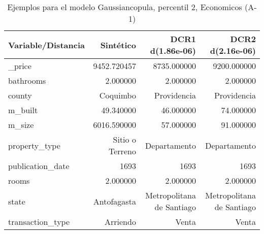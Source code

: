 \begin{table}[H]
\centering
\fontsize{10}{14}\selectfont
\caption{Ejemplos para el modelo Gaussiancopula, percentil 2, Economicos (A-1)}
\label{table-example-economicos-a-1-gaussiancopula-2p}
\begin{tabular}{|l|r|r|r|}
\hline
\rowcolor[gray]{0.8}
Variable/Distancia & Sintético & DCR1 d(1.86e-06) & DCR2 d(2.16e-06) \\
\hline \_price & \cellcolor[rgb]{0.9, 0.54, 0.52} 9452.720457 & 8735.000000 & 9200.000000 \\
\hline bathrooms & \cellcolor[rgb]{0.9, 0.54, 0.52} 2.000000 & \cellcolor[rgb]{0.9, 0.54, 0.52} 2.000000 & \cellcolor[rgb]{0.9, 0.54, 0.52} 2.000000 \\
\hline county & \cellcolor[rgb]{0.9, 0.54, 0.52} Coquimbo & Providencia & Providencia \\
\hline m\_built & \cellcolor[rgb]{0.9, 0.54, 0.52} 49.340000 & 46.000000 & 74.000000 \\
\hline m\_size & \cellcolor[rgb]{0.9, 0.54, 0.52} 6016.590000 & 57.000000 & 91.000000 \\
\hline property\_type & \cellcolor[rgb]{0.9, 0.54, 0.52} Sitio o Terreno & Departamento & Departamento \\
\hline publication\_date & \cellcolor[rgb]{0.9, 0.54, 0.52} 1693 & \cellcolor[rgb]{0.9, 0.54, 0.52} 1693 & \cellcolor[rgb]{0.9, 0.54, 0.52} 1693 \\
\hline rooms & \cellcolor[rgb]{0.9, 0.54, 0.52} 2.000000 & \cellcolor[rgb]{0.9, 0.54, 0.52} 2.000000 & \cellcolor[rgb]{0.9, 0.54, 0.52} 2.000000 \\
\hline state & \cellcolor[rgb]{0.9, 0.54, 0.52} Antofagasta & Metropolitana de Santiago & Metropolitana de Santiago \\
\hline transaction\_type & \cellcolor[rgb]{0.9, 0.54, 0.52} Arriendo & Venta & Venta \\
\hline
\end{tabular}
\end{table}
